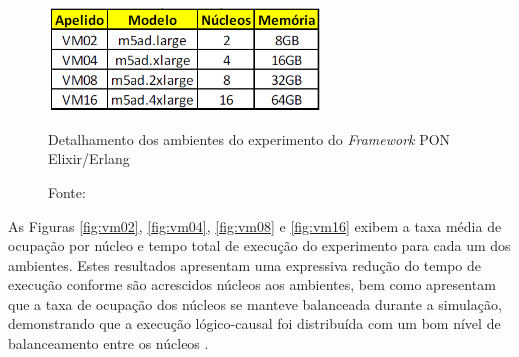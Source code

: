 \begin{figure}[!htb]
  \centering
  \includegraphics[width=0.65\textwidth]{../figures/maquinas_elixir.png}
  \smallskip
  \caption{Detalhamento dos ambientes do experimento do \textit{Framework} PON
    Elixir/Erlang} \caption*{Fonte: }
  \label{fig:ambientes_elixir}
\end{figure}

As Figuras \ref{fig:vm02}, \ref{fig:vm04}, \ref{fig:vm08} e \ref{fig:vm16}
exibem a taxa média de ocupação por núcleo e tempo total de execução do
experimento para cada um dos ambientes. Estes resultados apresentam uma
expressiva redução do tempo de execução conforme são acrescidos núcleos aos
ambientes, bem como apresentam que a taxa de ocupação dos núcleos se manteve
balanceada durante a simulação, demonstrando que a execução lógico-causal foi
distribuída com um bom nível de balanceamento entre os núcleos
\cite{msc_negrini_2019}.

